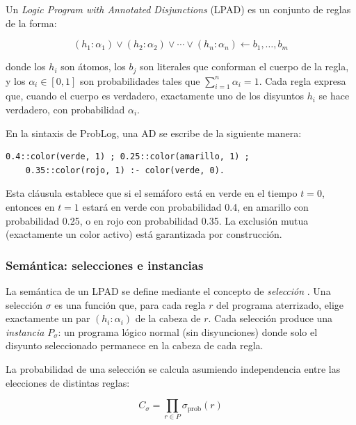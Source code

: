Un \textit{Logic Program with Annotated Disjunctions} (LPAD) es un conjunto de reglas de la forma:

\begin{equation}
    (h_1 : \alpha_1) \vee (h_2 : \alpha_2) \vee \cdots \vee (h_n : \alpha_n) \leftarrow b_1, \ldots, b_m
    \label{eq:lpad-rule}
\end{equation}

donde los $h_i$ son átomos, los $b_j$ son literales que conforman el cuerpo de la regla, y los $\alpha_i \in [0, 1]$ son probabilidades tales que $\sum_{i=1}^{n} \alpha_i = 1$. Cada regla expresa que, cuando el cuerpo es verdadero, exactamente uno de los disyuntos $h_i$ se hace verdadero, con probabilidad $\alpha_i$.

En la sintaxis de ProbLog, una AD se escribe de la siguiente manera:

\begin{lstlisting}[caption={Ejemplo de Disyunción Anotada en ProbLog.}]
% El semaforo cambia de color con cierta probabilidad
0.4::color(verde, 1) ; 0.25::color(amarillo, 1) ;
    0.35::color(rojo, 1) :- color(verde, 0).
\end{lstlisting}

Esta cláusula establece que si el semáforo está en verde en el tiempo $t=0$, entonces en $t=1$ estará en verde con probabilidad 0.4, en amarillo con probabilidad 0.25, o en rojo con probabilidad 0.35. La exclusión mutua (exactamente un color activo) está garantizada por construcción.

\subsubsection{Semántica: selecciones e instancias}

La semántica de un LPAD se define mediante el concepto de \textit{selección} \cite{vennekens2004lpads}. Una selección $\sigma$ es una función que, para cada regla $r$ del programa aterrizado, elige exactamente un par $(h_i : \alpha_i)$ de la cabeza de $r$. Cada selección produce una \textit{instancia} $P_\sigma$: un programa lógico normal (sin disyunciones) donde solo el disyunto seleccionado permanece en la cabeza de cada regla.

La probabilidad de una selección se calcula asumiendo independencia entre las elecciones de distintas reglas:

\begin{equation}
    C_\sigma = \prod_{r \in P} \sigma_{\text{prob}}(r)
    \label{eq:selection-probability}
\end{equation}

